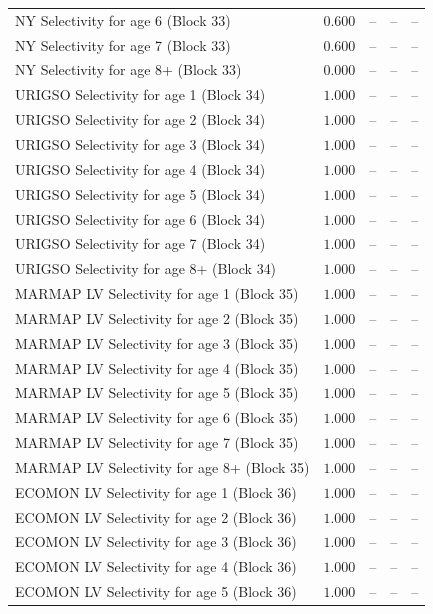 \documentclass[
]{article}
\begin{document}
\begin{landscape}
\begin{longtable}[t]{lrrrr}
NY Selectivity for age 6 (Block 33) & $0.600$ & -- & -- & --\\
NY Selectivity for age 7 (Block 33) & $0.600$ & -- & -- & --\\
NY Selectivity for age 8+ (Block 33) & $0.000$ & -- & -- & --\\
\addlinespace
URIGSO Selectivity for age 1 (Block 34) & $1.000$ & -- & -- & --\\
URIGSO Selectivity for age 2 (Block 34) & $1.000$ & -- & -- & --\\
URIGSO Selectivity for age 3 (Block 34) & $1.000$ & -- & -- & --\\
URIGSO Selectivity for age 4 (Block 34) & $1.000$ & -- & -- & --\\
URIGSO Selectivity for age 5 (Block 34) & $1.000$ & -- & -- & --\\
\addlinespace
URIGSO Selectivity for age 6 (Block 34) & $1.000$ & -- & -- & --\\
URIGSO Selectivity for age 7 (Block 34) & $1.000$ & -- & -- & --\\
URIGSO Selectivity for age 8+ (Block 34) & $1.000$ & -- & -- & --\\
MARMAP LV Selectivity for age 1 (Block 35) & $1.000$ & -- & -- & --\\
MARMAP LV Selectivity for age 2 (Block 35) & $1.000$ & -- & -- & --\\
\addlinespace
MARMAP LV Selectivity for age 3 (Block 35) & $1.000$ & -- & -- & --\\
MARMAP LV Selectivity for age 4 (Block 35) & $1.000$ & -- & -- & --\\
MARMAP LV Selectivity for age 5 (Block 35) & $1.000$ & -- & -- & --\\
MARMAP LV Selectivity for age 6 (Block 35) & $1.000$ & -- & -- & --\\
MARMAP LV Selectivity for age 7 (Block 35) & $1.000$ & -- & -- & --\\
\addlinespace
MARMAP LV Selectivity for age 8+ (Block 35) & $1.000$ & -- & -- & --\\
ECOMON LV Selectivity for age 1 (Block 36) & $1.000$ & -- & -- & --\\
ECOMON LV Selectivity for age 2 (Block 36) & $1.000$ & -- & -- & --\\
ECOMON LV Selectivity for age 3 (Block 36) & $1.000$ & -- & -- & --\\
ECOMON LV Selectivity for age 4 (Block 36) & $1.000$ & -- & -- & --\\
\addlinespace
ECOMON LV Selectivity for age 5 (Block 36) & $1.000$ & -- & -- & --\\

\end{longtable}
\end{landscape}
\end{document}
